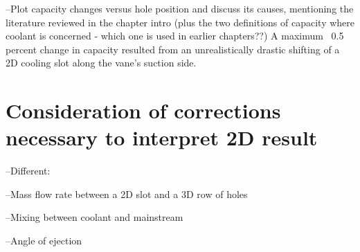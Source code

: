 \documentclass[11pt, twoside]{report}
\begin{document}
--Plot capacity changes versus hole position and discuss its causes, mentioning the literature reviewed in the chapter intro (plus the two definitions of capacity where coolant is concerned - which one is used in earlier chapters??) A maximum ~0.5 percent change in capacity resulted from an unrealistically drastic shifting of a 2D cooling slot along the vane’s suction side.

    
\section{Consideration of corrections necessary to interpret 2D result}

--Different:

--Mass flow rate between a 2D slot and a 3D row of holes

--Mixing between coolant and mainstream

--Angle of ejection
\end{document}

